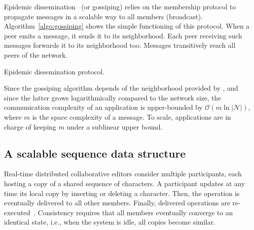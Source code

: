 Epidemic dissemination~\cite{birman1999bimodal,demers1987epidemic} (or
gossiping) relies on the membership protocol to propagate messages in a scalable
way to all members (broadcast). Algorithm~\ref{algo:gossiping} shows the simple
functioning of this protocol. When a peer emits a message, it sends it to its
neighborhood. Each peer receiving such messages forwards it to its neighborhood
too. Messages transitively reach all peers of the network.

\begin{algorithm}[h]
  
  \caption{\label{algo:gossiping}Epidemic dissemination protocol.}
\end{algorithm}

Since the gossiping algorithm depends of the neighborhood provided by \SPRAY,
and since the latter grows logarithmically compared to the network size, the
communication complexity of an application is upper-bounded by
$\mathcal{O}(m \ln |\mathcal{N}|)$, where $m$ is the space complexity of a
message. To scale, applications are in charge of keeping $m$ under a sublinear
upper bound.




\subsection{A scalable sequence data structure}

Real-time distributed collaborative editors consider multiple participants, each
hosting a copy of a shared sequence of characters. A participant updates at any
time its local copy by inserting or deleting a character. Then, the operation is
eventually delivered to all other members. Finally, delivered operations are
re-executed~\cite{saito2005optimistic}. Consistency requires that all members
eventually converge to an identical state, i.e., when the system is idle, all
copies become similar.

